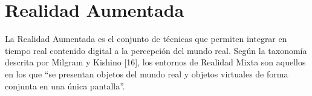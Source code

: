 



%

\section{Realidad Aumentada}

La Realidad Aumentada es el conjunto de técnicas que permiten integrar en tiempo real contenido digital a la percepción del mundo real. Según la taxonomía descrita por Milgram y Kishino [16], los entornos de Realidad Mixta son aquellos en los que “se presentan objetos del mundo real y objetos virtuales de forma conjunta en una única pantalla”.

